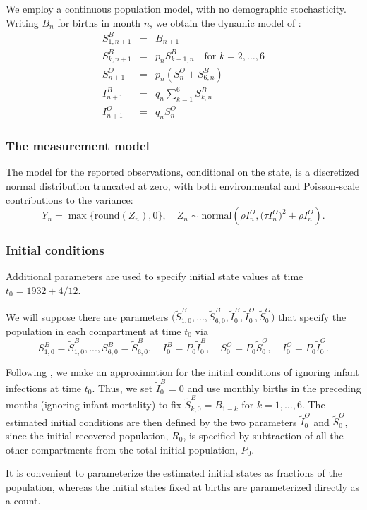 \begin{frame}

\bi
\item We employ a continuous population model, with no demographic stochasticity. Writing $B_n$ for births in month $n$, we obtain the dynamic model of \citet{Martinez-Bakker2015}:
$$\begin{array}{rcl}
S^B_{1,n+1}&=&B_{n+1}\\
S^B_{k,n+1}&=&p_nS^B_{k-1,n} \quad\mbox{for $k=2,\dots,6$}\\
S^O_{n+1}&=& p_n(S^O_n+S^B_{6,n})\\
I^B_{n+1}&=& q_n \sum_{k=1}^6 S^B_{k,n}\\
I^O_{n+1}&=& q_n S^O_n
\end{array}$$
\ei

\end{frame}

\begin{frame}[fragile]
\frametitle{The measurement model}

\bi
\item 
The model for the reported observations, conditional on the state, is a discretized normal distribution truncated at zero, with both environmental and Poisson-scale contributions to the variance:
$$Y_n= \max\{\mathrm{round}(Z_n),0\}, \quad Z_n\sim\mathrm{normal}\left(\rho I^O_n, \big(\tau  I^O_n\big)^2 + \rho I^O_n\right).$$
\ei

\end{frame}

\begin{frame}[fragile]

\frametitle{Initial conditions}

\bi
\item 
Additional parameters are used to specify initial state values at time $t_0=1932+ 4/12$.
\item 
We will suppose there are parameters $\big(\tilde S^B_{1,0},...,\tilde S^B_{6,0}, \tilde I^B_0,\tilde I^O_0,\tilde S^O_0\big)$ that specify the population in each compartment at time $t_0$ via
$$ S^B_{1,0}= {\tilde S}^B_{1,0} ,...,S^B_{6,0}= \tilde S^B_{6,0}, \quad I^B_{0}= P_0 \tilde I^B_{0},\quad S^O_{0}= P_0 \tilde S^O_{0}, \quad I^O_{0}= P_0 \tilde I^O_{0}.$$
\item
Following \citet{Martinez-Bakker2015}, we make an approximation for the initial conditions of ignoring infant infections at time $t_0$. 
Thus, we set $\tilde I^B_{0}=0$ and use monthly births in the preceding months (ignoring infant mortality) to fix $\tilde S^B_{k,0}=B_{1-k}$ for $k=1,\dots,6$. The estimated initial conditions are then defined by the two parameters $\tilde I^O_{0}$ and $\tilde S^O_{0}$, since the initial recovered population, $R_0$, is specified by subtraction of all the other compartments from the total initial population, $P_0$.
\item 
It is convenient to parameterize the estimated initial states as fractions of the population, whereas the initial states fixed at births are parameterized directly as a count.

\ei

\end{frame}

